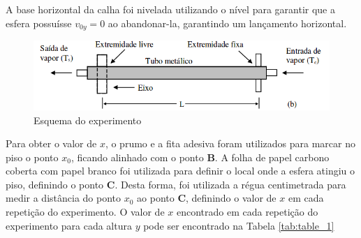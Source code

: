 \documentclass[10pt]{article}
\begin{document}
A base horizontal da calha foi nivelada utilizando o nível para garantir que a esfera possuísse $v_{0y} = 0$ ao abandonar-la, garantindo um lançamento horizontal.

\begin{figure}
	\begin{center}
		\includegraphics[scale=0.5]{aparato_expansao_termica.png}
		\caption{Esquema do experimento}
		\label{fig:aparato_expansao_termica}
	\end{center}
\end{figure}

Para obter o valor de $x$, o prumo e a fita adesiva foram utilizados para marcar no piso o ponto $x_0$, ficando alinhado com o ponto \textbf{B}. A folha de papel carbono coberta com papel branco foi utilizada para definir o local onde a esfera atingiu o piso, definindo o ponto \textbf{C}. Desta forma, foi utilizada a régua centimetrada para medir a distância do ponto $x_0$ ao ponto \textbf{C}, definindo o valor de $x$ em cada repetição do experimento. O valor de $x$ encontrado em cada repetição do experimento para cada altura $y$ pode ser encontrado na Tabela \ref{tab:table_1}


\begin{table}[h!]
	\begin{center}
		\caption{Resultados obtidos em cada repetição do experimento}
		\label{tab:table_1}
	\end{center}
\end{table}
\end{document}
